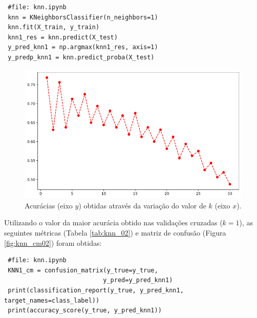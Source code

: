 \documentclass[
	article,			%
	11pt,				%
	oneside,			%
	a4paper,			%
	english,			%
	brazil,				%
	sumario=tradicional
	]{abntex2}
\begin{document}
\begin{verbatim}
 #file: knn.ipynb
 knn = KNeighborsClassifier(n_neighbors=1)
 knn.fit(X_train, y_train)
 knn1_res = knn.predict(X_test)
 y_pred_knn1 = np.argmax(knn1_res, axis=1)
 y_predp_knn1 = knn.predict_proba(X_test)
\end{verbatim}


\begin{figure}[h!]
 \centering
 \includegraphics[scale=0.5]{fig/knn_grid.png}
 \caption{Acurácias (eixo $y$) obtidas através da variação do valor de $k$ (eixo $x$).}
 \label{fig:knn_grid}
\end{figure}

Utilizando o valor da maior acurácia obtido nas validações cruzadas ($k=1$), as seguintes métricas (Tabela \ref{tab:knn_02}) e matriz de confusão (Figura \ref{fig:knn_cm02}) foram obtidas:

\begin{verbatim}
 #file: knn.ipynb
 KNN1_cm = confusion_matrix(y_true=y_true, 
                           y_pred=y_pred_knn1)
 print(classification_report(y_true, y_pred_knn1, target_names=class_label))
 print(accuracy_score(y_true, y_pred_knn1))                           
\end{verbatim}
\end{document}
